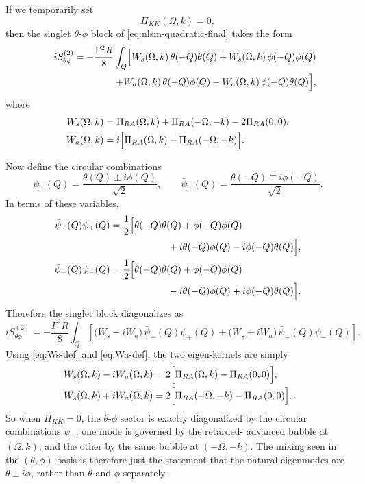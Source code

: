 \documentclass[aps,prx,preprint,amsmath,amssymb]{revtex4-2}
\begin{document}
If we temporarily set
\begin{equation}
\Pi_{KK}(\Omega,k)=0,
\end{equation}
then the singlet \(\theta\)-\(\phi\) block of
\eqref{eq:nlsm-quadratic-final} takes the form
\begin{equation}\label{eq:theta-phi-block}
\begin{split}
iS^{(2)}_{\theta\phi}
=
-\frac{\Gamma^2R}{8}\int_Q
\Bigl[
W_s(\Omega,k)\,\theta(-Q)\theta(Q)
+W_s(\Omega,k)\,\phi(-Q)\phi(Q)
\\
\qquad\qquad\qquad\qquad
+W_a(\Omega,k)\,\theta(-Q)\phi(Q)
-W_a(\Omega,k)\,\phi(-Q)\theta(Q)
\Bigr],
\end{split}
\end{equation}
where
\begin{align}
W_s(\Omega,k)
&=
\Pi_{RA}(\Omega,k)+\Pi_{RA}(-\Omega,-k)-2\Pi_{RA}(0,0),
\label{eq:Ws-def}
\\
W_a(\Omega,k)
&=
i\Bigl[\Pi_{RA}(\Omega,k)-\Pi_{RA}(-\Omega,-k)\Bigr].
\label{eq:Wa-def}
\end{align}

Now define the circular combinations
\begin{equation}\label{eq:psi-pm-def}
\psi_\pm(Q)=\frac{\theta(Q)\pm i\phi(Q)}{\sqrt2},
\qquad
\bar\psi_\pm(Q)=\frac{\theta(-Q)\mp i\phi(-Q)}{\sqrt2}.
\end{equation}
In terms of these variables,
\begin{align}
\bar\psi_+(Q)\psi_+(Q)
&=
\frac{1}{2}\Bigl[
\theta(-Q)\theta(Q)+\phi(-Q)\phi(Q)
\notag\\
&\qquad\qquad\qquad
+i\theta(-Q)\phi(Q)-i\phi(-Q)\theta(Q)
\Bigr],
\\
\bar\psi_-(Q)\psi_-(Q)
&=
\frac{1}{2}\Bigl[
\theta(-Q)\theta(Q)+\phi(-Q)\phi(Q)
\notag\\
&\qquad\qquad\qquad
-i\theta(-Q)\phi(Q)+i\phi(-Q)\theta(Q)
\Bigr].
\end{align}
Therefore the singlet block diagonalizes as
\begin{equation}\label{eq:theta-phi-diagonalized}
iS^{(2)}_{\theta\phi}
=
-\frac{\Gamma^2R}{8}\int_Q
\left[
\bigl(W_s-iW_a\bigr)\,\bar\psi_+(Q)\psi_+(Q)
+\bigl(W_s+iW_a\bigr)\,\bar\psi_-(Q)\psi_-(Q)
\right].
\end{equation}
Using \eqref{eq:Ws-def} and \eqref{eq:Wa-def}, the two eigen-kernels are simply
\begin{align}
W_s(\Omega,k)-iW_a(\Omega,k)
&=
2\Bigl[\Pi_{RA}(\Omega,k)-\Pi_{RA}(0,0)\Bigr],
\\
W_s(\Omega,k)+iW_a(\Omega,k)
&=
2\Bigl[\Pi_{RA}(-\Omega,-k)-\Pi_{RA}(0,0)\Bigr].
\end{align}
So when \(\Pi_{KK}=0\), the \(\theta\)-\(\phi\) sector is exactly diagonalized by
the circular combinations \(\psi_\pm\): one mode is governed by the retarded-
advanced bubble at \((\Omega,k)\), and the other by the same bubble at
\((-\Omega,-k)\).  The mixing seen in the \((\theta,\phi)\) basis is therefore
just the statement that the natural eigenmodes are \(\theta\pm i\phi\), rather
than \(\theta\) and \(\phi\) separately.
\end{document}
